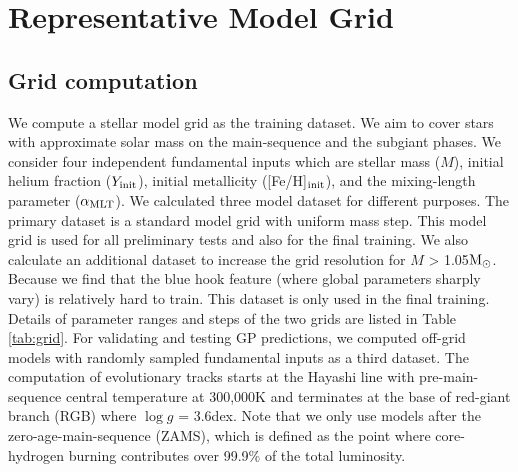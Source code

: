 \section{Representative Model Grid}\label{sec:grid}

\subsection{Grid computation}

We compute a stellar model grid as the training dataset. We aim to cover stars with approximate solar mass on the main-sequence and the subgiant phases. We consider four independent fundamental inputs which are stellar mass ($M$), initial helium fraction ($Y_{\rm init}$), initial metallicity ([Fe/H]$_{\rm init}$), and the mixing-length parameter ($\alpha_{\rm MLT}$). 
%
We calculated three model dataset for different purposes. The primary dataset is a standard model grid with uniform mass step. This model grid is used for all preliminary tests and also for the final training. 
%
We also calculate an additional dataset to increase the grid resolution for $M$ > 1.05$\rm M_{\odot}$. Because we find that the blue hook feature (where global parameters sharply vary) is relatively hard to train. This dataset is only used in the final training. 
Details of parameter ranges and steps of the two grids are listed in Table \ref{tab:grid}. 
%
For validating and testing GP predictions, we computed off-grid models with randomly sampled fundamental inputs as a third dataset. 
%
%
The computation of evolutionary tracks starts at the Hayashi line with pre-main-sequence central temperature at 300,000K and terminates at the base of red-giant branch (RGB) where $\log g$ = 3.6dex. Note that we only use models after the zero-age-main-sequence (ZAMS), which is defined as the point where core-hydrogen burning contributes over 99.9\% of the total luminosity. 
%

